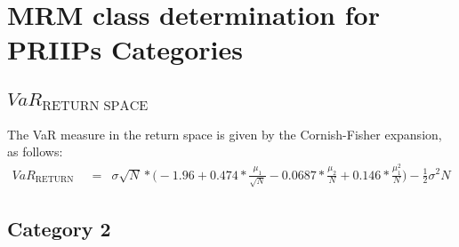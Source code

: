 \section{MRM class determination for PRIIPs Categories}

\subsection{$VaR_{\text{RETURN SPACE}}$}
The VaR measure in the return space is given by the Cornish-Fisher expansion, as follows:
\begin{eqnarray}
	\label{Eq:VaR}
	\nonumber
	VaR_{\text{RETURN SPACE}} &=& \sigma\sqrt{N} * \Bigg(-1.96 + 0.474 *  \frac{\mu_{1}}{\sqrt{N}} - 0.0687 * \frac{\mu_{2}}{N} + 0.146 * \frac{\mu_{1}^{2}}{N}\Bigg) - \frac{1}{2}\sigma^{2}N
\end{eqnarray}

\subsection{Category 2}

